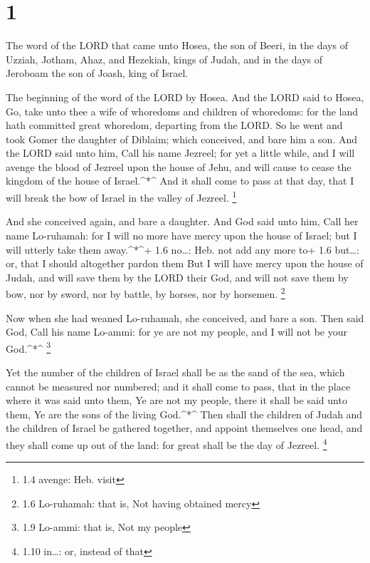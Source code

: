 \hypertarget{section}{%
\section{1}\label{section}}

 The word of the LORD that came unto Hosea, the son of
Beeri, in the days of Uzziah, Jotham, Ahaz, and Hezekiah, kings of
Judah, and in the days of Jeroboam the son of Joash, king of Israel.

 The beginning of the word of the LORD by Hosea. And the
LORD said to Hosea, Go, take unto thee a wife of whoredoms and children
of whoredoms: for the land hath committed great whoredom, departing from
the LORD.  So he went and took Gomer the daughter of
Diblaim; which conceived, and bare him a son.  And the LORD
said unto him, Call his name Jezreel; for yet a little while, and I will
avenge the blood of Jezreel upon the house of Jehu, and will cause to
cease the kingdom of the house of Israel.\^{}*\^{}  And it
shall come to pass at that day, that I will break the bow of Israel in
the valley of Jezreel. \footnote{1.4 avenge: Heb. visit}

 And she conceived again, and bare a daughter. And God said
unto him, Call her name Lo-ruhamah: for I will no more have mercy upon
the house of Israel; but I will utterly take them away.\^{}*\^{}+ 1.6
no\ldots: Heb. not add any more to+ 1.6 but\ldots: or, that I should
altogether pardon them  But I will have mercy upon the house
of Judah, and will save them by the LORD their God, and will not save
them by bow, nor by sword, nor by battle, by horses, nor by horsemen.
\footnote{1.6 Lo-ruhamah: that is, Not having obtained mercy}

 Now when she had weaned Lo-ruhamah, she conceived, and bare
a son.  Then said God, Call his name Lo-ammi: for ye are not
my people, and I will not be your God.\^{}*\^{} \footnote{1.9 Lo-ammi:
  that is, Not my people}

 Yet the number of the children of Israel shall be as the
sand of the sea, which cannot be measured nor numbered; and it shall
come to pass, that in the place where it was said unto them, Ye are not
my people, there it shall be said unto them, Ye are the sons of the
living God.\^{}*\^{}  Then shall the children of Judah and
the children of Israel be gathered together, and appoint themselves one
head, and they shall come up out of the land: for great shall be the day
of Jezreel. \footnote{1.10 in\ldots: or, instead of that}

